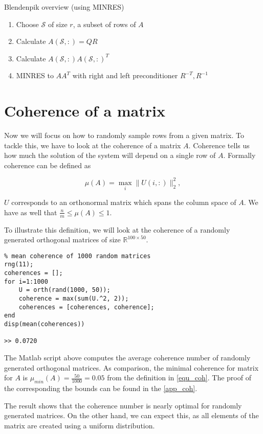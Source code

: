 \documentclass{article}
\begin{document}
\begin{algorithm}[htb]
\caption{Blendenpik overview (using MINRES)}
\begin{enumerate}
\item Choose $\mathcal{S}$ of size $r$, a subset of rows of $A$
\item Calculate $A(\mathcal{S},:) = QR$ 
\item Calculate $A(\mathcal{S}, :)A(\mathcal{S}, :)^T$
\item MINRES to $AA^T$ with right and left preconditioner $R^{-T}, R^{-1}$
\end{enumerate}
\end{algorithm}

\section{Coherence of a matrix}
Now we will focus on how to randomly sample rows from a given matrix. To tackle
this, we have to look at the coherence of a matrix $A$. Coherence tells us how
much the solution of the system will depend on a single row of $A$. Formally
coherence can be defined as

\begin{equation} \label{equ_coh}
\mu(A)=\max _{i}\|U(i,:)\|_{2}^{2},
\end{equation}

$U$ corresponds to an orthonormal matrix which spans the column space of $A$. We
have as well that $\frac{n}{m} \le \mu(A) \le 1$.

\bigskip

To illustrate this definition, we will look at the coherence of a randomly
generated orthogonal matrices of size $\mathbb{R}^{100 \times 50}$.

\begin{verbatim}
% mean coherence of 1000 random matrices
rng(11);
coherences = [];
for i=1:1000
    U = orth(rand(1000, 50));
    coherence = max(sum(U.^2, 2));
    coherences = [coherences, coherence];
end
disp(mean(coherences))

>> 0.0720
\end{verbatim}

The Matlab script above computes the average coherence number of randomly
generated orthogonal matrices. As comparison, the minimal coherence for matrix
for $A$ is $\mu_{min}(A)= \frac{50}{1000} = 0.05$ from the definition in
\ref{equ_coh}. The proof of the corresponding the bounds can be found in the
\ref{app_coh}.

The result shows that the coherence number is nearly optimal for randomly
generated matrices. On the other hand, we can expect this, as all
elements of the matrix are created using a uniform distribution. 
\end{document}
